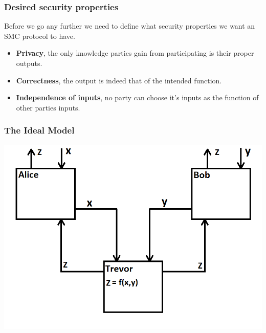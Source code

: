 \documentclass{beamer}
\begin{document}
	\begin{frame}
		\frametitle{Desired security properties}

		Before we go any further we need to define what security properties we want an SMC protocol to have.
		
		\begin{itemize}
			\item \textbf{Privacy}, the only knowledge parties gain from participating is their proper outputs.
			\item \textbf{Correctness}, the output is indeed that of the intended function.
			\item \textbf{Independence of inputs}, no party can choose it's inputs as the function of other parties inputs.
		\end{itemize}

	\end{frame}


	\begin{frame}
		\frametitle{The Ideal Model}

		\includegraphics[scale=0.6]{Images/IdealModel}
	\end{frame}
\end{document}
